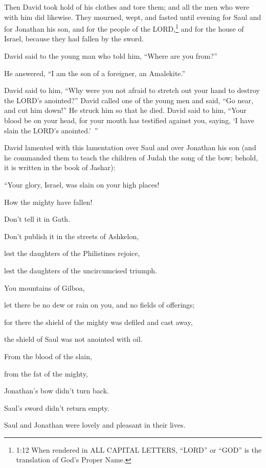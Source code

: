\myverse{}Then David took hold of his clothes and tore them; and all the
men who were with him did likewise.
\myverse{}They mourned, wept, and fasted until evening for Saul and for Jonathan his
son, and for the people of the LORD,\footnote{1:12 When rendered in ALL CAPITAL LETTERS, “LORD” or “GOD” is the translation of God’s Proper Name.}
and for the house of Israel, because they had fallen by the sword.

\myverse{}David said to the young man who told him, “Where are you from?”

He answered, “I am the son of a foreigner, an Amalekite.”

\myverse{}David said to him, “Why were you not afraid to stretch out your
hand to destroy the LORD’s anointed?”
\myverse{}David called one of the young men and said, “Go near, and cut him down!” He
struck him so that he died.
\myverse{}David said to him, “Your blood be on your head, for your mouth has testified
against you, saying, ‘I have slain the LORD’s anointed.’ ”

\myverse{}David lamented with this lamentation over Saul and over Jonathan
his son
\myverse{}(and he commanded them to teach the children of Judah the song of the bow;
behold, it is written in the book of Jashar):

\myverse{}“Your glory, Israel, was slain on your high places!

How the mighty have fallen!

\myverse{}Don’t tell it in Gath.

Don’t publish it in the streets of Ashkelon,

lest the daughters of the Philistines rejoice,

lest the daughters of the uncircumcised triumph.

\myverse{}You mountains of Gilboa,

let there be no dew or rain on you, and no fields of offerings;

for there the shield of the mighty was defiled and cast away,

the shield of Saul was not anointed with oil.

\myverse{}From the blood of the slain,

from the fat of the mighty,

Jonathan’s bow didn’t turn back.

Saul’s sword didn’t return empty.

\myverse{}Saul and Jonathan were lovely and pleasant in their lives.


